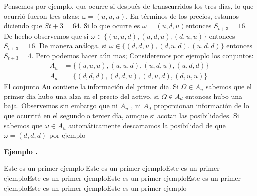 \documentclass[14pt]{extreport}
\newcounter{ejemplo}[chapter]
\newenvironment{ejemplo}
   {%
    \par\medskip
    \refstepcounter{ejemplo}%
  \noindent
  \textbf{Ejemplo \theejemplo.}
  \par%
   }{%
   \medskip
   }
\begin{document}
Pensemos por ejemplo, que ocurre si después de transcurridos los tres días, lo que ocurrió fueron tres alzas: $\omega = (u,
u, u)$. En términos de los precios, estamos diciendo que $St+3 = 64$. Si lo que ocurre es $\omega = (u, d, u )$entonces $S_{t+3} = 16$. De hecho observemos que
si $\omega \in \{(u, u, d), (u, d, u), (d, u, u)\}$ entonces $S_{t+3} = 16$. De manera
análoga, si $\omega \in \{(d, d, u), (d, u, d), (u, d, d)\}$ entonces $S_{t+3} = 4$.
Pero podemos hacer aún mas; Consideremos por ejemplo los conjuntos: 
\begin{equation*}
	\begin{split}
		A_u & = \{(u, u, u), (u, u, d), (u, d, u), (u, d, d)\} \\
      A_d & = \{(d, d, d), (d, d,u), (d, u, d), (d, u, u)\} 
	\end{split}
\end{equation*}
El conjunto Au contiene la información del primer dia. Si $\Omega \in A_u$ sabemos que el primer dia hubo una alza en el precio del activo, si $\Omega \in A_d$ entonces hubo una baja. Observemos sin embargo que ni $A_u$ , ni $A_d$ proporcionan información de lo que ocurrirá en el segundo o tercer día, aunque si acotan las posibilidades. Si sabemos que $\omega \in A_u$ automáticamente descartamos la posibilidad de que $\omega = (d, d,
d)$ por ejemplo. 

\begin{ejemplo}
	Este es un primer ejemplo Este es un primer ejemploEste es un primer ejemploEste es un primer ejemploEste es un primer ejemploEste es un primer ejemploEste es un primer ejemploEste es un primer ejemplo
\end{ejemplo}
\end{document}
